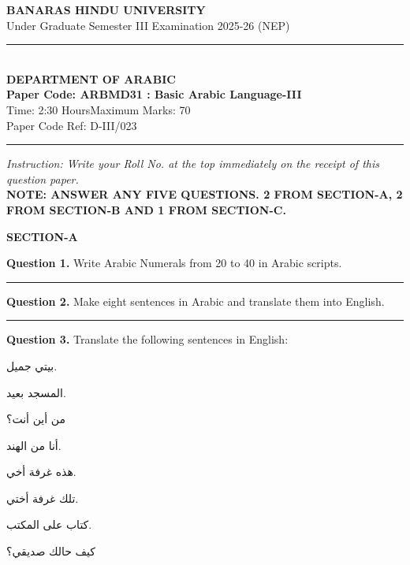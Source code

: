 \documentclass[11pt,a4paper]{article}
\begin{document}
\begin{center}
  {\large\bfseries BANARAS HINDU UNIVERSITY}\\[2pt]
  {\normalsize Under Graduate Semester III Examination 2025-26 (NEP)}\\[6pt]
  \rule{0.8\linewidth}{0.5pt}\\[6pt]
  {\large\bfseries DEPARTMENT OF ARABIC}\\[4pt]
  {\large\bfseries Paper Code: ARBMD31 : Basic Arabic Language-III}\\[4pt]
  {\normalsize Time: 2:30 Hours\hfill Maximum Marks: 70}\\[2pt]
  {\small Paper Code Ref: D-III/023}
\end{center}

\rule{\linewidth}{0.4pt}

\smallskip



\noindent   \textit{Instruction: Write your Roll No. at the top immediately on the receipt of this question paper.}\\[2pt]



\noindent   \textbf{NOTE: ANSWER ANY FIVE QUESTIONS. 2 FROM SECTION-A, 2 FROM SECTION-B AND 1 FROM SECTION-C.}

\bigskip


\begin{center}
  {\bfseries\large SECTION-A}
\end{center}




\noindent   \textbf{Question 1.} Write Arabic Numerals from 20 to 40 in Arabic scripts.

\medskip\rule{\linewidth}{0.2pt}\medskip




\noindent   \textbf{Question 2.} Make eight sentences in Arabic and translate them into English.

\medskip\rule{\linewidth}{0.2pt}\medskip




\noindent   \textbf{Question 3.} Translate the following sentences in English:

\begin{parts}
  \item بيتي جميل.
  \item المسجد بعيد.
  \item من أين أنت؟
  \item أنا من الهند.
  \item هذه غرفة أخي.
  \item تلك غرفة أختي.
  \item كتاب على المكتب.
  \item كيف حالك صديقي؟
\end{parts}
\end{document}
